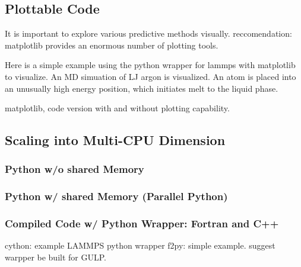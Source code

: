 \subsection{Plottable Code}

It is important to explore various predictive methods visually.  
reccomendation: matplotlib provides an enormous number of plotting 
tools.

Here is a simple example using the python wrapper for lammps 
with matplotlib to visualize. An MD simuation of LJ argon 
is visualized. An atom is placed into an unusually high energy 
position, which initiates melt to the liquid phase. 

matplotlib, code version with and without plotting capability.

\subsection{Scaling into Multi-CPU Dimension}

\subsubsection{Python w/o shared Memory}

\subsubsection{Python w/ shared Memory (Parallel Python)}

\subsubsection{Compiled Code w/ Python Wrapper: Fortran and C++}

cython: example LAMMPS python wrapper
f2py: simple example. suggest warpper be built for GULP.

